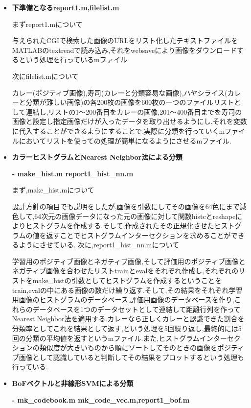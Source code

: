 \documentclass[11pt,a4j]{jreport}
\begin{document}
\begin{itemize}
\item \textbf{下準備となるreport1.m,filelist.m}
  
まずreport1.mについて
  
与えられたCGIで検索した画像のURLをリスト化したテキストファイルをMATLABのtextreadで読み込み,それをwebsaveにより画像をダウンロードするという処理を行っているmファイル.

次にfilelist.mについて

カレー(ポジティブ画像),寿司(カレーと分類容易な画像),ハヤシライス(カレーと分類が難しい画像)の各200枚の画像を600枚の一つのファイルリストとして連結し,リストの1〜200番目をカレーの画像,201〜400番目までを寿司の画像と設定し指定画像だけが入ったデータを取り出せるようにし,それを変数に代入することができるようにすることで,実際に分類を行っていくmファイルにおいてリストを使っての処理が簡単になるようにさせるmファイル.
\item \textbf{カラーヒストグラムとNearest Neighbor法による分類}

  \hspace{0.5cm}\textbf{- make\_hist.m report1\_hist\_nn.m}
  
  まず,make\_hist.mについて

  設計方針の項目でも説明をしたが,画像を引数にしてその画像を64色にまで減色して,64次元の画像データになった元の画像に対して関数histcとreshapeによりヒストグラムを作成する.そして,作成されたその正規化させたヒストグラムの値を返すことでヒストグラムインターセクションを求めることができるようにさせている.
\newpage
  次に,report1\_hist\_nn.mについて

  学習用のポジティブ画像とネガティブ画像,そして評価用のポジティブ画像とネガティブ画像を合わせたリストtrainとevalをそれぞれ作成し,それぞれのリストをmake\_histの引数としてヒストグラムを作成するということをtrain,evalの中にある画像の数だけ繰り返す.そして,その結果をそれぞれ学習用画像のヒストグラムのデータベース,評価用画像のデータベースを作り,これらのデータベースを1つのデータセットとして連結して距離行列を作ってNearest Neighbor法を適用する.カレーなら正しくカレーと認識できた割合を分類率としてこれを結果として返す,という処理を5回繰り返し,最終的には5回の分類の平均値を返すというmファイル.また,ヒストグラムインターセクションの類似度が大きいものから順にソートしてそのときの画像をポジティブ画像として認識していると判断してその結果をプロットするという処理も行っている.

\item \textbf{BoFベクトルと非線形SVMによる分類}
  
  \hspace{0.5cm}\textbf{- mk\_codebook.m mk\_code\_vec.m,report1\_bof.m}


\end{itemize}
\end{document}
